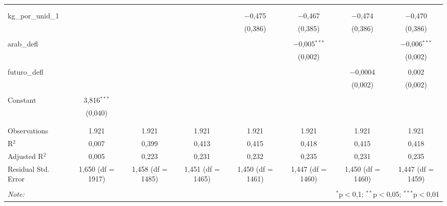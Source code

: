 \begin{table}[!htbp]
\begin{tabular}{@{\extracolsep{5pt}}lccccccc}
  &  &  &  &  &  &  &  \\ 
  & & & & & & & \\ 
 kg\_por\_unid\_1 &  &  &  & $-$0,475 & $-$0,467 & $-$0,474 & $-$0,470 \\ 
  &  &  &  & (0,386) & (0,385) & (0,386) & (0,386) \\ 
  & & & & & & & \\ 
 arab\_defl &  &  &  &  & $-$0,005$^{***}$ &  & $-$0,006$^{***}$ \\ 
  &  &  &  &  & (0,002) &  & (0,002) \\ 
  & & & & & & & \\ 
 futuro\_defl &  &  &  &  &  & $-$0,0004 & 0,002 \\ 
  &  &  &  &  &  & (0,002) & (0,002) \\ 
  & & & & & & & \\ 
 Constant & 3,816$^{***}$ &  &  &  &  &  &  \\ 
  & (0,040) &  &  &  &  &  &  \\ 
  & & & & & & & \\ 
\hline \\[-1.8ex] 
Observations & 1.921 & 1.921 & 1.921 & 1.921 & 1.921 & 1.921 & 1.921 \\ 
R$^{2}$ & 0,007 & 0,399 & 0,413 & 0,415 & 0,418 & 0,415 & 0,418 \\ 
Adjusted R$^{2}$ & 0,005 & 0,223 & 0,231 & 0,232 & 0,235 & 0,231 & 0,235 \\ 
Residual Std. Error & 1,650 (df = 1917) & 1,458 (df = 1485) & 1,451 (df = 1465) & 1,450 (df = 1461) & 1,447 (df = 1460) & 1,450 (df = 1460) & 1,447 (df = 1459) \\ 
\hline 
\hline \\[-1.8ex] 
\textit{Note:}  & \multicolumn{7}{r}{$^{*}$p$<$0,1; $^{**}$p$<$0,05; $^{***}$p$<$0,01} \\ 
\end{tabular} 
\end{table} 
